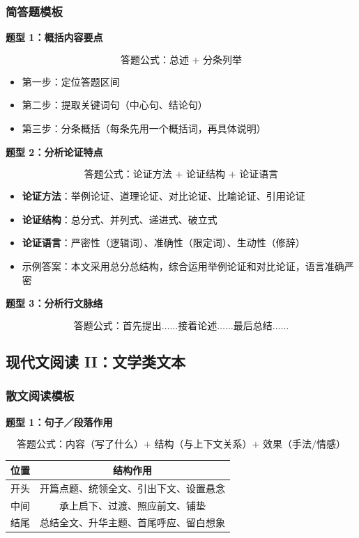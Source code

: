 \subsubsection{简答题模板}

\textbf{题型 1：概括内容要点}

\[
\text{答题公式：总述 + 分条列举}
\]

\begin{itemize}
  \item 第一步：定位答题区间
  \item 第二步：提取关键词句（中心句、结论句）
  \item 第三步：分条概括（每条先用一个概括词，再具体说明）
\end{itemize}

\textbf{题型 2：分析论证特点}

\[
\text{答题公式：论证方法 + 论证结构 + 论证语言}
\]

\begin{itemize}
  \item \textbf{论证方法}：举例论证、道理论证、对比论证、比喻论证、引用论证
  \item \textbf{论证结构}：总分式、并列式、递进式、破立式
  \item \textbf{论证语言}：严密性（逻辑词）、准确性（限定词）、生动性（修辞）
  \item 示例答案：本文采用总分总结构，综合运用举例论证和对比论证，语言准确严密
\end{itemize}

\textbf{题型 3：分析行文脉络}

\[
\text{答题公式：首先提出……接着论述……最后总结……}
\]

\subsection{现代文阅读 II：文学类文本}

\subsubsection{散文阅读模板}

\textbf{题型 1：句子／段落作用}

\[
\text{答题公式：内容（写了什么）+ 结构（与上下文关系）+ 效果（手法/情感）}
\]

\begin{center}
\begin{tabular}{c|c}
\textbf{位置} & \textbf{结构作用} \\ \hline
开头 & 开篇点题、统领全文、引出下文、设置悬念 \\
中间 & 承上启下、过渡、照应前文、铺垫 \\
结尾 & 总结全文、升华主题、首尾呼应、留白想象 \\
\end{tabular}
\end{center}

